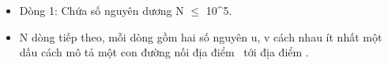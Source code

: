 \begin{itemize}
	\item Dòng 1: Chứa số nguyên dương N  $\le$  10^5.
	\item N dòng tiếp theo, mỗi dòng gồm hai số nguyên u, v cách nhau ít nhất một dấu cách mô tả một con đường nối địa điểm  tới địa điểm .
\end{itemize}
